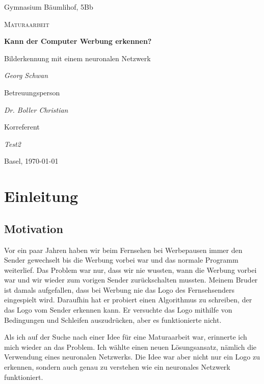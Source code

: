 \documentclass[12pt,a4paper]{report}
\begin{document}
\begin{titlepage}
	\centering
	{\Large Gymnasium Bäumlihof, 5Bb \par}
	\vspace{1cm}
	{\LARGE\scshape Maturaarbeit\par}
	\vspace{1.5cm}
	{\huge\bfseries Kann der Computer Werbung erkennen?\par}
	\vspace{0.6cm}
    {\Large Bilderkennung mit einem neuronalen Netzwerk\par}
	\vspace{2cm}
	{\Large\itshape Georg Schwan\par}
	\vfill
	Betreuungsperson\par
	{\itshape Dr. Boller Christian\par}
	Korreferent\par
	{\itshape Test2}
	\vfill
	{\large Basel, \today\par}
\end{titlepage}

\tableofcontents

\chapter{Einleitung}\label{ch:einleitung}

\section{Motivation}
\label{sec:motivation}
Vor ein paar Jahren haben wir beim Fernsehen bei Werbepausen immer den Sender gewechselt
bis die Werbung vorbei war und das normale Programm weiterlief.
Das Problem war nur, dass wir nie wussten, wann die Werbung vorbei war und wir wieder zum vorigen Sender zurückschalten mussten.
Meinem Bruder ist damals aufgefallen, dass bei Werbung nie das Logo des Fernsehsenders eingespielt wird.
Daraufhin hat er probiert einen Algorithmus zu schreiben, der das Logo vom Sender erkennen kann.
Er versuchte das Logo mithilfe von Bedingungen und Schleifen auszudrücken, aber es funktionierte nicht.

Als ich auf der Suche nach einer Idee für eine Maturaarbeit war, erinnerte ich mich wieder an das Problem.
Ich wählte einen neuen Lösungsansatz, nämlich die Verwendung eines neuronalen Netzwerks.
Die Idee war aber nicht nur ein Logo zu erkennen, sondern auch genau zu verstehen wie ein neuronales Netzwerk funktioniert.
\end{document}
